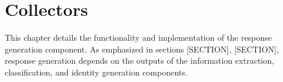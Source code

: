 \chapter{Collectors}

This chapter details the functionality and implementation of the response generation component. As emphasized in sections [SECTION], [SECTION], response generation depends on the outputs of the information extraction, classification, and identity generation components. 

